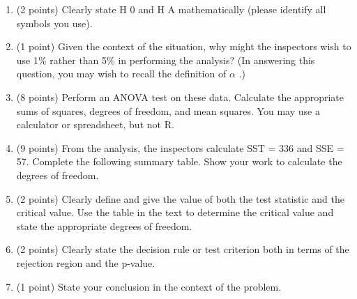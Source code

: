 \documentclass{article}
\begin{document}
\begin{enumerate}
\begin{enumerate}
		\item (2 points) Clearly state H 0 and H A mathematically (please identify all symbols you use).
		
		\item (1 point) Given the context of the situation, why might the inspectors wish to use 1\% rather than 5\% in performing the analysis? (In answering this question, you may wish to recall the definition of $\alpha$ .)
		
		\item (8 points) Perform an ANOVA test on these data. Calculate the appropriate sums of squares, degrees of freedom, and mean squares. You may use a calculator or spreadsheet, but not R.
		
		\item (9 points) From the analysis, the inspectors calculate SST = 336 and SSE = 57. Complete the following summary table. Show your work to calculate the degrees of freedom.
	
	
		\item (2 points) Clearly define and give the value of both the test statistic and the critical value. Use the table in the text to determine the critical value and state the appropriate degrees of freedom.

		\item (2 points) Clearly state the decision rule or test criterion both in terms of the rejection region and the p-value.	
	
		\item (1 point) State your conclusion in the context of the problem.
		
	
	
	
	
	\end{enumerate}
	
	
	


	
		
\end{enumerate}
\end{document}
